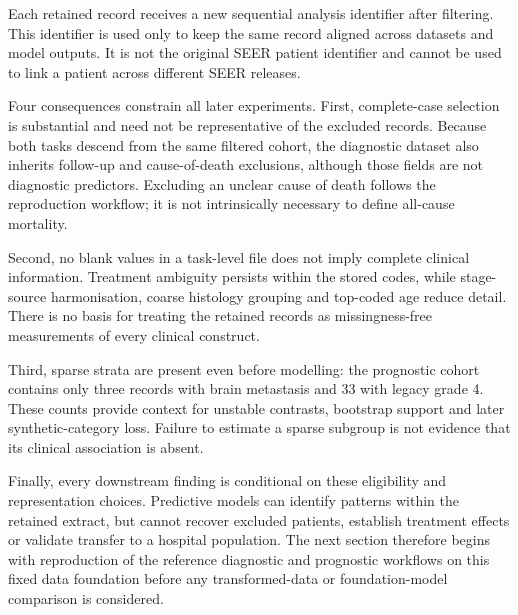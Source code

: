 Each retained record receives a new sequential analysis identifier after
filtering. This identifier is used only to keep the same record aligned across
datasets and model outputs. It is not the original SEER patient identifier and
cannot be used to link a patient across different SEER releases.

Four consequences constrain all later experiments. First,
complete-case selection is substantial and need not be representative of the
excluded records. Because both tasks descend from the same filtered cohort,
the diagnostic dataset also inherits follow-up and cause-of-death exclusions,
although those fields are not diagnostic predictors. Excluding an unclear
cause of death follows the reproduction workflow; it is not intrinsically
necessary to define all-cause mortality.

Second, no blank values in a task-level file does not imply complete clinical
information. Treatment ambiguity persists within the stored codes, while
stage-source harmonisation, coarse histology grouping and top-coded age reduce
detail. There is no basis for treating the retained records as missingness-free
measurements of every clinical construct.

Third, sparse strata are present even before modelling: the prognostic cohort
contains only three records with brain metastasis and 33 with legacy grade 4.
These counts provide context for unstable contrasts, bootstrap support and
later synthetic-category loss. Failure to estimate a sparse subgroup is not
evidence that its clinical association is absent.

Finally, every downstream finding is conditional on these eligibility and
representation choices. Predictive models can identify patterns within the
retained extract, but cannot recover excluded patients, establish treatment
effects or validate transfer to a hospital population. The next section
therefore begins with reproduction of the reference diagnostic and prognostic
workflows on this fixed data foundation before any transformed-data or
foundation-model comparison is considered.
